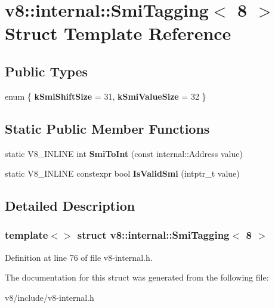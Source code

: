 \hypertarget{structv8_1_1internal_1_1SmiTagging_3_018_01_4}{}\section{v8\+:\+:internal\+:\+:Smi\+Tagging$<$ 8 $>$ Struct Template Reference}
\label{structv8_1_1internal_1_1SmiTagging_3_018_01_4}
\subsection*{Public Types}
\begin{DoxyCompactItemize}
\item 
\mbox{\label{structv8_1_1internal_1_1SmiTagging_3_018_01_4_aec48ea556ba2a9534a5ed83443a53764}} 
enum \{ {\bfseries k\+Smi\+Shift\+Size} = 31, 
{\bfseries k\+Smi\+Value\+Size} = 32
 \}
\end{DoxyCompactItemize}
\subsection*{Static Public Member Functions}
\begin{DoxyCompactItemize}
\item 
\mbox{\label{structv8_1_1internal_1_1SmiTagging_3_018_01_4_a3d0223bc60d1cc83f7931b298bedb335}} 
static V8\+\_\+\+I\+N\+L\+I\+NE int {\bfseries Smi\+To\+Int} (const internal\+::\+Address value)
\item 
\mbox{\label{structv8_1_1internal_1_1SmiTagging_3_018_01_4_aba20851b9b3a19360435f2afb05d4aaf}} 
static V8\+\_\+\+I\+N\+L\+I\+NE constexpr bool {\bfseries Is\+Valid\+Smi} (intptr\+\_\+t value)
\end{DoxyCompactItemize}


\subsection{Detailed Description}
\subsubsection*{template$<$$>$\newline
struct v8\+::internal\+::\+Smi\+Tagging$<$ 8 $>$}



Definition at line 76 of file v8-\/internal.\+h.



The documentation for this struct was generated from the following file\+:\begin{DoxyCompactItemize}
\item 
v8/include/v8-\/internal.\+h\end{DoxyCompactItemize}
